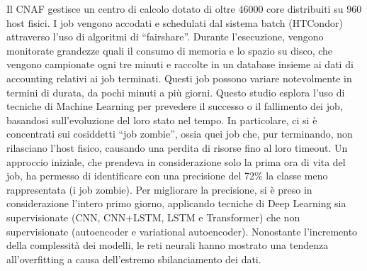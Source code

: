 Il CNAF gestisce un centro di calcolo dotato di oltre 46000 core distribuiti
su 960 host fisici. I job vengono accodati e schedulati dal sistema batch
(HTCondor) attraverso l'uso di algoritmi di ``fairshare''.
Durante l'esecuzione, vengono monitorate grandezze quali il consumo di memoria
e lo spazio su disco, che vengono campionate ogni tre minuti e raccolte in un
database insieme ai dati di accounting relativi ai job terminati.
Questi job possono variare notevolmente in termini di durata, da pochi minuti
a più giorni.
Questo studio esplora l'uso di tecniche di Machine Learning per prevedere il
successo o il fallimento dei job, basandosi sull'evoluzione del loro stato nel
tempo.
In particolare, ci si è concentrati sui cosiddetti ``job zombie'', ossia quei
job che, pur terminando, non rilasciano l'host fisico, causando una perdita di
risorse fino al loro timeout.
Un approccio iniziale, che prendeva in considerazione solo la prima ora di
vita del job, ha permesso di identificare con una precisione del 72\% la
classe meno rappresentata (i job zombie).
Per migliorare la precisione, si è preso in considerazione l'intero primo
giorno, applicando tecniche di Deep Learning sia supervisionate (CNN,
CNN+LSTM, LSTM e Transformer) che non supervisionate (autoencoder e
variational autoencoder). 
Nonostante l'incremento della complessità dei modelli, le reti neurali hanno
mostrato una tendenza all'overfitting a causa dell'estremo sbilanciamento dei
dati.
